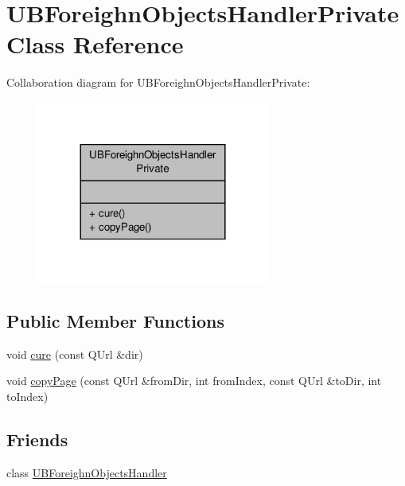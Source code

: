 \hypertarget{class_u_b_foreighn_objects_handler_private}{\section{U\-B\-Foreighn\-Objects\-Handler\-Private Class Reference}
\label{db/d70/class_u_b_foreighn_objects_handler_private}
}


Collaboration diagram for U\-B\-Foreighn\-Objects\-Handler\-Private\-:
\nopagebreak
\begin{figure}[H]
\begin{center}
\leavevmode
\includegraphics[width=216pt]{d5/dfc/class_u_b_foreighn_objects_handler_private__coll__graph}
\end{center}
\end{figure}
\subsection*{Public Member Functions}
\begin{DoxyCompactItemize}
\item 
void \hyperlink{class_u_b_foreighn_objects_handler_private_aa747ec8e48e5b439c6e6d147868eb0e9}{cure} (const Q\-Url \&dir)
\item 
void \hyperlink{class_u_b_foreighn_objects_handler_private_a3267852f2cd292741592cf0548affaa3}{copy\-Page} (const Q\-Url \&from\-Dir, int from\-Index, const Q\-Url \&to\-Dir, int to\-Index)
\end{DoxyCompactItemize}
\subsection*{Friends}
\begin{DoxyCompactItemize}
\item 
class \hyperlink{class_u_b_foreighn_objects_handler_private_afcce3131bc8458c8f53279a28e7b0099}{U\-B\-Foreighn\-Objects\-Handler}
\end{DoxyCompactItemize}


